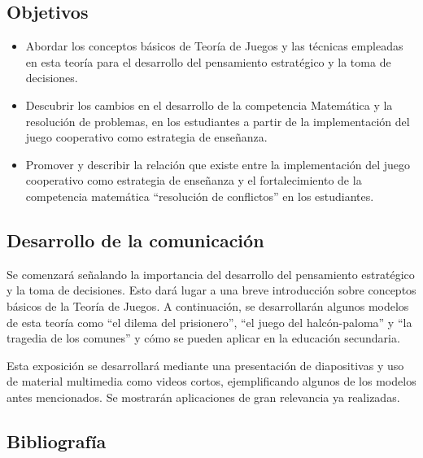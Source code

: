 \subsection{Objetivos}

\begin{itemize}
	\item Abordar los conceptos básicos de Teoría de Juegos y las técnicas empleadas en esta teoría para el desarrollo del pensamiento estratégico y la toma de decisiones.
	\item Descubrir los cambios en el desarrollo de la competencia Matemática y la resolución de problemas, en los estudiantes a partir de la implementación del juego cooperativo como estrategia de enseñanza.
	\item Promover y describir la relación que existe entre la implementación del juego cooperativo como estrategia de enseñanza y el fortalecimiento de la competencia matemática “resolución de conflictos” en los estudiantes.
\end{itemize}

\subsection{Desarrollo de la comunicación}

Se comenzará señalando la importancia del desarrollo del pensamiento estratégico y la toma de decisiones. Esto dará lugar a una breve introducción sobre conceptos básicos de la Teoría de Juegos. A continuación, se desarrollarán algunos modelos de esta teoría como “el dilema del prisionero”, “el juego del halcón-paloma” y “la tragedia de los comunes” y cómo se pueden aplicar en la educación secundaria.

Esta exposición se desarrollará mediante una presentación de diapositivas y uso de material multimedia como videos cortos, ejemplificando algunos de los modelos antes mencionados. Se mostrarán aplicaciones de gran relevancia ya realizadas.

\subsection{Bibliografía}

\nocite{*}
\printbibliography[keyword={08}]